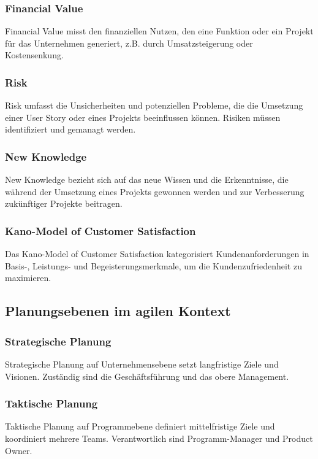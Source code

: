 \subsubsection{Financial Value}
Financial Value misst den finanziellen Nutzen, den eine Funktion oder ein Projekt für das Unternehmen generiert, z.B. durch Umsatzsteigerung oder Kostensenkung.

\subsubsection{Risk}
Risk umfasst die Unsicherheiten und potenziellen Probleme, die die Umsetzung einer User Story oder eines Projekts beeinflussen können. Risiken müssen identifiziert und gemanagt werden.

\subsubsection{New Knowledge}
New Knowledge bezieht sich auf das neue Wissen und die Erkenntnisse, die während der Umsetzung eines Projekts gewonnen werden und zur Verbesserung zukünftiger Projekte beitragen.

\subsubsection{Kano-Model of Customer Satisfaction}
Das Kano-Model of Customer Satisfaction kategorisiert Kundenanforderungen in Basis-, Leistungs- und Begeisterungsmerkmale, um die Kundenzufriedenheit zu maximieren.

\subsection{Planungsebenen im agilen Kontext}

\subsubsection{Strategische Planung}
Strategische Planung auf Unternehmensebene setzt langfristige Ziele und Visionen. Zuständig sind die Geschäftsführung und das obere Management.

\subsubsection{Taktische Planung}
Taktische Planung auf Programmebene definiert mittelfristige Ziele und koordiniert mehrere Teams. Verantwortlich sind Programm-Manager und Product Owner.

